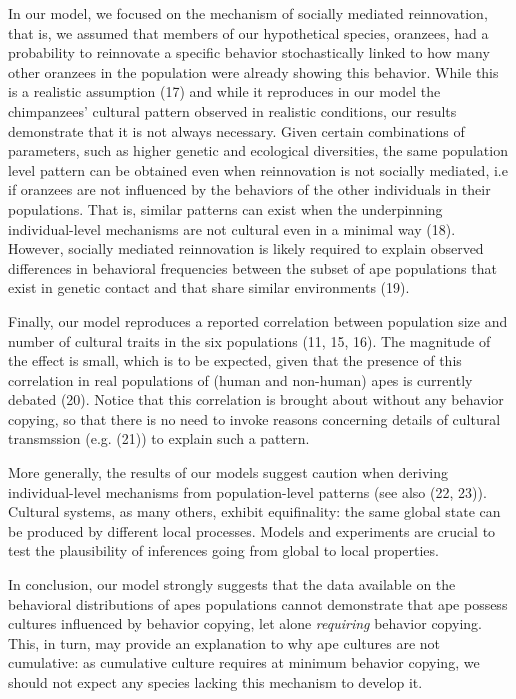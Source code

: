 \documentclass[9pt,twocolumn,twoside,]{pnas-new}
\begin{document}
In our model, we focused on the mechanism of socially mediated
reinnovation, that is, we assumed that members of our hypothetical
species, oranzees, had a probability to reinnovate a specific behavior
stochastically linked to how many other oranzees in the population were
already showing this behavior. While this is a realistic assumption (17)
and while it reproduces in our model the chimpanzees' cultural pattern
observed in realistic conditions, our results demonstrate that it is not
always necessary. Given certain combinations of parameters, such as
higher genetic and ecological diversities, the same population level
pattern can be obtained even when reinnovation is not socially mediated,
i.e if oranzees are not influenced by the behaviors of the other
individuals in their populations. That is, similar patterns can exist
when the underpinning individual-level mechanisms are not cultural even
in a minimal way (18). However, socially mediated reinnovation is likely
required to explain observed differences in behavioral frequencies
between the subset of ape populations that exist in genetic contact and
that share similar environments (19).

Finally, our model reproduces a reported correlation between population
size and number of cultural traits in the six populations (11, 15, 16).
The magnitude of the effect is small, which is to be expected, given
that the presence of this correlation in real populations of (human and
non-human) apes is currently debated (20). Notice that this correlation
is brought about without any behavior copying, so that there is no need
to invoke reasons concerning details of cultural transmssion (e.g. (21))
to explain such a pattern.

More generally, the results of our models suggest caution when deriving
individual-level mechanisms from population-level patterns (see also
(22, 23)). Cultural systems, as many others, exhibit equifinality: the
same global state can be produced by different local processes. Models
and experiments are crucial to test the plausibility of inferences going
from global to local properties.

In conclusion, our model strongly suggests that the data available on
the behavioral distributions of apes populations cannot demonstrate that
ape possess cultures influenced by behavior copying, let alone
\emph{requiring} behavior copying. This, in turn, may provide an
explanation to why ape cultures are not cumulative: as cumulative
culture requires at minimum behavior copying, we should not expect any
species lacking this mechanism to develop it.
\end{document}
